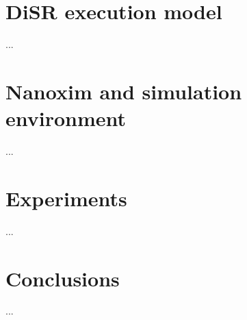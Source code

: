 \documentclass[conference]{IEEEtran}
\begin{document}
\section{DiSR execution model}
...


\section{Nanoxim and simulation environment}
...


\section{Experiments}
...


\section{Conclusions}
...


\balance

 


\end{document}
